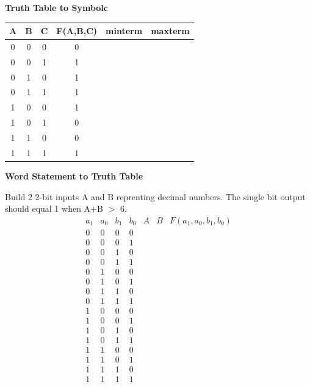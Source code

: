 \pagebreak

{\bf Truth Table to Symbolc}

\begin{tabular}{c|c|c||c|c|c}
A & B & C & F(A,B,C)	& minterm & maxterm	\\ \hline
0 & 0 & 0 & 0		&		& 	\\ \hline
0 & 0 & 1 & 1		& 		&	\\ \hline
0 & 1 & 0 & 1		& 		&	\\ \hline
0 & 1 & 1 & 1		& 		&	\\ \hline
1 & 0 & 0 & 1		& 		&	\\ \hline
1 & 0 & 1 & 0		& 		&	\\ \hline
1 & 1 & 0 & 0		& 		&	\\ \hline
1 & 1 & 1 & 1		& 		&	\\ 
\end{tabular}

\vspace{0.2in}

{\bf Word Statement to Truth Table}

Build 2 2-bit inputs A and B reprenting decimal numbers.  The single bit
output should equal 1 when A+B $>$ 6.
$$\begin{array}{c|c|c|c||c|c||c}
a_1 & a_0 & b_1 & b_0 & A  & B & F(a_1, a_0, b_1, b_0) 	\\ \hline
0 & 0 & 0 & 0 &  &  &   \\ \hline
0 & 0 & 0 & 1 &  &  &   \\ \hline
0 & 0 & 1 & 0 &  &  &   \\ \hline
0 & 0 & 1 & 1 &  &  &   \\ \hline
0 & 1 & 0 & 0 &  &  &   \\ \hline
0 & 1 & 0 & 1 &  &  &   \\ \hline
0 & 1 & 1 & 0 &  &  &   \\ \hline
0 & 1 & 1 & 1 &  &  &   \\ \hline
1 & 0 & 0 & 0 &  &  &   \\ \hline
1 & 0 & 0 & 1 &  &  &   \\ \hline
1 & 0 & 1 & 0 &  &  &   \\ \hline
1 & 0 & 1 & 1 &  &  &   \\ \hline
1 & 1 & 0 & 0 &  &  &   \\ \hline
1 & 1 & 0 & 1 &  &  &   \\ \hline
1 & 1 & 1 & 0 &  &  &   \\ \hline
1 & 1 & 1 & 1 &  &  &   \\ 
\end{array}$$


